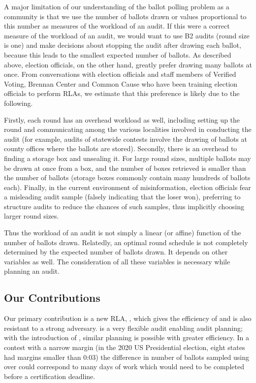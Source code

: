 A major limitation of our understanding of the ballot polling problem as a community is that we use the number of ballots drawn or values proportional to this number \cite{mclaughlin_thesis,bernhard-diss,RI-report} as measures of the workload of an audit. If this were a correct measure of the workload of an audit, we would want to use B2 audits (round size is one) and make decisions about stopping the audit after drawing each ballot, because this leads to the smallest expected number of ballots. As described above, election officials, on the other hand, greatly prefer drawing many ballots at once. From conversations with election officials and staff members of Verified Voting, Brennan Center and Common Cause who have been training election officials to perform RLAs, we estimate that this preference is likely due to the following. 

Firstly, each round has an overhead workload as well, including setting up the round and communicating among the various localities involved in conducting the audit (for example, audits of statewide contests involve the drawing of ballots at county offices where the ballots are stored). Secondly, there is an overhead to finding a storage box and unsealing it. For large round sizes, multiple ballots may be drawn at once from a box, and the number of boxes retrieved is smaller than the number of ballots (storage boxes commonly contain many hundreds of ballots each). 
Finally, in the current environment of misinformation, election officials fear a misleading audit sample (falsely indicating that the loser won), preferring to structure audits to reduce the chances of such samples, thus implicitly choosing larger round sizes. 

Thus the workload of an audit is not simply a linear (or affine) function of the number of ballots drawn. Relatedly, an optimal round schedule is not completely determined by the expected number of ballots drawn. It depends on other variables as well. The consideration of all these variables is necessary while planning an audit. 

\subsection{Our Contributions}
Our primary contribution is a new RLA, \Providence, which gives the efficiency of \Minerva and is also resistant to a strong adversary. 
\BRAVO is a very flexible audit enabling audit planning; with the introduction of \Providence, similar planning is possible with greater efficiency. In a contest with a narrow margin (in the 2020 US Presidential election, eight states had margins smaller than 0:03) the difference in number of ballots sampled using \Providence over \BRAVO could correspond to many days of work which would need to be completed before a certification deadline.

